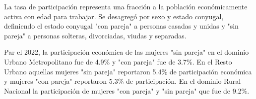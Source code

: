 La tasa de participación representa una fracción a la población económicamente activa con edad para trabajar. Se desagregó por sexo y estado conyugal, definiendo el estado conyugal "con pareja" a personas casadas y unidas y "sin pareja" a personas solteras, divorciadas, viudas y separadas.  

Par el 2022, la participación económica de las mujeres "sin pareja" en el dominio Urbano Metropolitano fue de 4.9\% y "con pareja" fue de 3.7\%. En el Resto Urbano aquellas mujeres "sin pareja" reportaron 5.4\% de participación económica y mujeres "con pareja" reportaron 5.3\% de participación. En el dominio Rural Nacional la participación de mujeres "con pareja" y "sin pareja" que fue de 9.2\%. 
